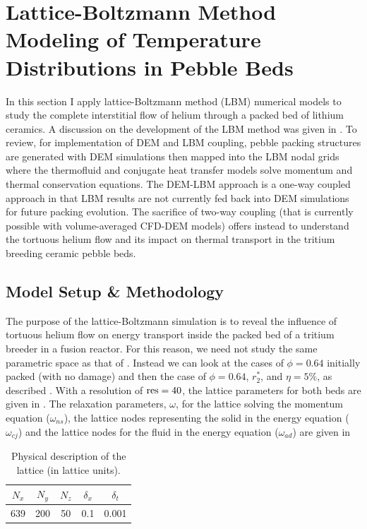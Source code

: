 \section{Lattice-Boltzmann Method Modeling of Temperature Distributions in Pebble Beds}\label{sec:lbm-studies}
In this section I apply lattice-Boltzmann method (LBM) numerical models to study the complete interstitial flow of helium through a packed bed of lithium ceramics. A discussion on the development of the LBM method was given in . To review, for implementation of DEM and LBM coupling, pebble packing structures are generated with DEM simulations then mapped into the LBM nodal grids where the thermofluid and conjugate heat transfer models solve momentum and thermal conservation equations. The DEM-LBM approach is a one-way coupled approach in that LBM results are not currently fed back into DEM simulations for future packing evolution. The sacrifice of two-way coupling (that is currently possible with volume-averaged CFD-DEM models) offers instead to understand the tortuous helium flow and its impact on thermal transport in the tritium breeding ceramic pebble beds.





\subsection{Model Setup \& Methodology}
The purpose of the lattice-Boltzmann simulation is to reveal the influence of tortuous helium flow on energy transport inside the packed bed of a tritium breeder in a fusion reactor. For this reason, we need not study the same parametric space as that of . Instead we can look at the cases of $\phi = 0.64$ initially packed (with no damage) and then the case of $\phi = 0.64$, $r_2^*$, and $\eta = 5\%$, as described . With a resolution of $\text{res} = 40$, the lattice parameters for both beds are given in . The relaxation parameters, $\omega$, for the lattice solving the momentum equation ($\omega_{ns}$), the lattice nodes representing the solid in the energy equation ($\omega_{cj}$) and the lattice nodes for the fluid in the energy equation ($\omega_{ad}$) are given in 

\begin {table}[ht] %
\caption{Physical description of the lattice (in lattice units).}
\label{tab:lbm-parameters} \centering %
\begin {tabular}{ ccccc }
\toprule %
$N_x$   &   $N_y$  &   $N_z$    &   $\delta_x$   & $\delta_t$    \\\toprule
639      &   200     &   50     &    0.1         &  0.001        \\\bottomrule
\end{tabular}
\end{table}

